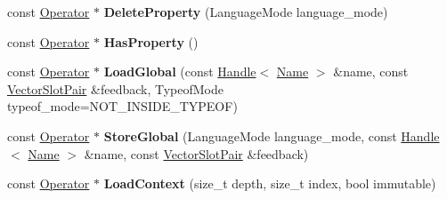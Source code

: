 \begin{DoxyCompactItemize}
\item 
const \hyperlink{classv8_1_1internal_1_1compiler_1_1_operator}{Operator} $\ast$ {\bfseries Delete\+Property} (Language\+Mode language\+\_\+mode)\hypertarget{classv8_1_1internal_1_1compiler_1_1_j_s_operator_builder_a59c5c69e71c00c877c761404b304ac8f}{}\label{classv8_1_1internal_1_1compiler_1_1_j_s_operator_builder_a59c5c69e71c00c877c761404b304ac8f}

\item 
const \hyperlink{classv8_1_1internal_1_1compiler_1_1_operator}{Operator} $\ast$ {\bfseries Has\+Property} ()\hypertarget{classv8_1_1internal_1_1compiler_1_1_j_s_operator_builder_a8ad3d6698a5f245c12f9d46a6e2e80cf}{}\label{classv8_1_1internal_1_1compiler_1_1_j_s_operator_builder_a8ad3d6698a5f245c12f9d46a6e2e80cf}

\item 
const \hyperlink{classv8_1_1internal_1_1compiler_1_1_operator}{Operator} $\ast$ {\bfseries Load\+Global} (const \hyperlink{classv8_1_1internal_1_1_handle}{Handle}$<$ \hyperlink{classv8_1_1internal_1_1_name}{Name} $>$ \&name, const \hyperlink{classv8_1_1internal_1_1compiler_1_1_vector_slot_pair}{Vector\+Slot\+Pair} \&feedback, Typeof\+Mode typeof\+\_\+mode=N\+O\+T\+\_\+\+I\+N\+S\+I\+D\+E\+\_\+\+T\+Y\+P\+E\+OF)\hypertarget{classv8_1_1internal_1_1compiler_1_1_j_s_operator_builder_a499ecf480915559b7f857e6598953bb6}{}\label{classv8_1_1internal_1_1compiler_1_1_j_s_operator_builder_a499ecf480915559b7f857e6598953bb6}

\item 
const \hyperlink{classv8_1_1internal_1_1compiler_1_1_operator}{Operator} $\ast$ {\bfseries Store\+Global} (Language\+Mode language\+\_\+mode, const \hyperlink{classv8_1_1internal_1_1_handle}{Handle}$<$ \hyperlink{classv8_1_1internal_1_1_name}{Name} $>$ \&name, const \hyperlink{classv8_1_1internal_1_1compiler_1_1_vector_slot_pair}{Vector\+Slot\+Pair} \&feedback)\hypertarget{classv8_1_1internal_1_1compiler_1_1_j_s_operator_builder_a66c56509a6a9834cdc913610477821c1}{}\label{classv8_1_1internal_1_1compiler_1_1_j_s_operator_builder_a66c56509a6a9834cdc913610477821c1}

\item 
const \hyperlink{classv8_1_1internal_1_1compiler_1_1_operator}{Operator} $\ast$ {\bfseries Load\+Context} (size\+\_\+t depth, size\+\_\+t index, bool immutable)\hypertarget{classv8_1_1internal_1_1compiler_1_1_j_s_operator_builder_aead4c26af455cd91df329c04097345ae}{}\label{classv8_1_1internal_1_1compiler_1_1_j_s_operator_builder_aead4c26af455cd91df329c04097345ae}


\end{DoxyCompactItemize}
